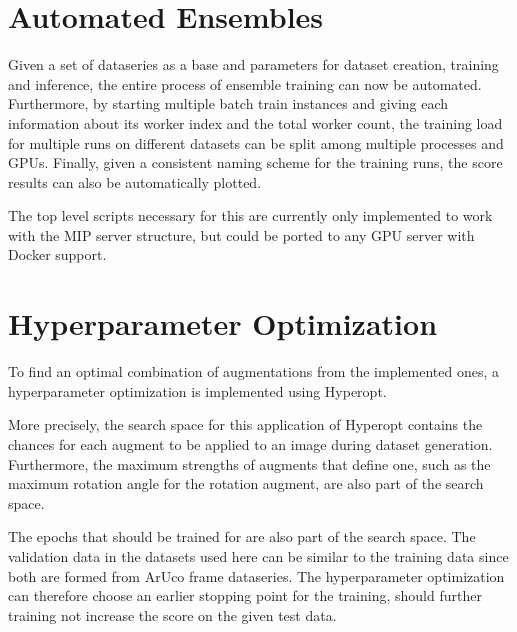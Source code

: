 \documentclass[10pt]{book}
\begin{document}

\section{Automated Ensembles}

Given a set of dataseries as a base and parameters for dataset creation, training and inference, the entire process of ensemble training can now be automated. Furthermore, by starting multiple batch train instances and giving each information about its worker index and the total worker count, the training load for multiple runs on different datasets can be split among multiple processes and \acp{GPU}. Finally, given a consistent naming scheme for the training runs, the score results can also be automatically plotted.

The top level scripts necessary for this are currently only implemented to work with the \ac{MIP} server structure, but could be ported to any \ac{GPU} server with Docker support.

\section{Hyperparameter Optimization}
\label{sec:hyper_opt}

To find an optimal combination of augmentations from the implemented ones, a hyperparameter optimization is implemented using Hyperopt. 

More precisely, the search space for this application of Hyperopt contains the chances for each augment to be applied to an image during dataset generation. Furthermore, the maximum strengths of augments that define one, such as the maximum rotation angle for the rotation augment, are also part of the search space. 

The epochs that should be trained for are also part of the search space. The validation data in the datasets used here can be similar to the training data since both are formed from \ac{ArUco} frame dataseries. The hyperparameter optimization can therefore choose an earlier stopping point for the training, should further training not increase the score on the given test data. 

\end{document}
